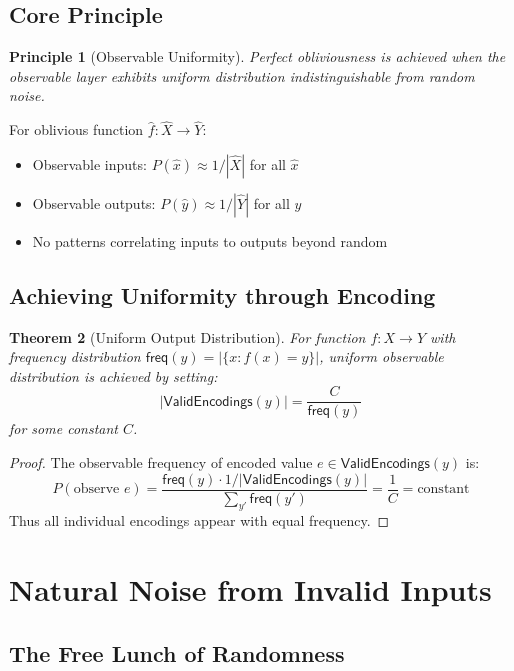 \documentclass[11pt,final]{article}
\newcommand{\ValidEnc}[1]{\mathsf{ValidEncodings}(#1)}
\newcommand{\Freq}[1]{\mathsf{freq}(#1)}
\newtheorem{theorem}{Theorem}[section]
\newtheorem{principle}[theorem]{Principle}
\begin{document}
\subsection{Core Principle}

\begin{principle}[Observable Uniformity]
Perfect obliviousness is achieved when the observable layer exhibits uniform distribution indistinguishable from random noise.
\end{principle}

For oblivious function $\hat{f}: \hat{X} \to \hat{Y}$:
\begin{itemize}
    \item Observable inputs: $P(\hat{x}) \approx 1/|\hat{X}|$ for all $\hat{x}$
    \item Observable outputs: $P(\hat{y}) \approx 1/|\hat{Y}|$ for all $\hat{y}$
    \item No patterns correlating inputs to outputs beyond random
\end{itemize}

\subsection{Achieving Uniformity through Encoding}

\begin{theorem}[Uniform Output Distribution]
For function $f: X \to Y$ with frequency distribution $\Freq{y} = |\{x : f(x) = y\}|$, uniform observable distribution is achieved by setting:
\begin{equation}
|\ValidEnc{y}| = \frac{C}{\Freq{y}}
\end{equation}
for some constant $C$.
\end{theorem}

\begin{proof}
The observable frequency of encoded value $e \in \ValidEnc{y}$ is:
\begin{equation}
P(\text{observe } e) = \frac{\Freq{y} \cdot 1/|\ValidEnc{y}|}{\sum_{y'} \Freq{y'}} = \frac{1}{C} = \text{constant}
\end{equation}
Thus all individual encodings appear with equal frequency.
\end{proof}

\section{Natural Noise from Invalid Inputs}

\subsection{The Free Lunch of Randomness}
\end{document}

